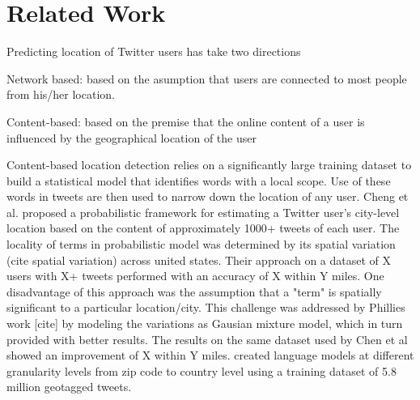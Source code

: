 \section{Related Work}
\label{sec:RelatedWork}

Predicting location of Twitter users has take two directions \begin{inparaenum}[(1)] \item Network based: based on the asumption that users are connected to most people from his/her location. \item Content-based: based on the premise that the online content of a user is influenced by the geographical location of the user \end{inparaenum}

Content-based location detection relies on a significantly large training dataset to build a statistical model that identifies words with a local scope. Use of these words in tweets are then used to narrow down the location of any user.  
Cheng et al. \cite{cheng2010you} proposed a probabilistic framework for estimating a Twitter user's city-level location based on the content of approximately 1000+ tweets of each user. The locality of terms in probabilistic model was determined by its spatial variation (cite spatial variation) across united states. Their approach on a dataset of X users with X+ tweets performed with an accuracy of X within Y miles. One disadvantage of this approach was the assumption that a "term" is spatially significant to a particular location/city. This challenge was addressed by Phillies work [cite] by modeling the variations as Gausian mixture model, which in turn provided with better results. The results on the same dataset used by Chen et al showed an improvement of X within Y miles.      
\cite{ferrara2012web} created language models at different granularity levels from zip code to country level using a training dataset of 5.8 million geotagged tweets.

